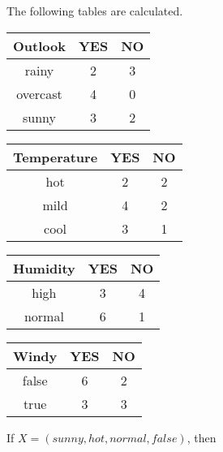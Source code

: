 \documentclass[11pt, a4paper]{article}
\begin{document}
\noindent The following tables are calculated.

\begin{table}[h!]
	\centering
	\label{tab:table2}
	\begin{tabular}{c|cc}
		\toprule
		\textbf{Outlook} & \textbf{YES} & \textbf{NO} \\
		\midrule
		rainy            & 2            & 3           \\
		overcast         & 4            & 0           \\
		sunny            & 3            & 2           \\
	\end{tabular}
	\hspace{2em}
	\vspace{2em}
	\label{tab:table3}
	\begin{tabular}{c|cc}
		\toprule
		\textbf{Temperature} & \textbf{YES} & \textbf{NO} \\
		\midrule
		hot                  & 2            & 2           \\
		mild                 & 4            & 2           \\
		cool                 & 3            & 1           \\
	\end{tabular}
	\label{tab:table4}
	\begin{tabular}{c|cc}
		\toprule
		\textbf{Humidity} & \textbf{YES} & \textbf{NO} \\
		\midrule
		high              & 3            & 4           \\
		normal            & 6            & 1           \\
	\end{tabular}
	\hspace{2em}
	\label{tab:table5}
	\begin{tabular}{c|cc}
		\toprule
		\textbf{Windy} & \textbf{YES} & \textbf{NO} \\
		\midrule
		false          & 6            & 2           \\
		true           & 3            & 3           \\
	\end{tabular}
\end{table}

If $X = (sunny, hot, normal, false)$, then 
\end{document}
